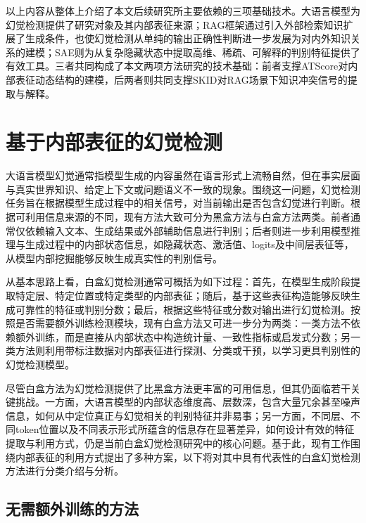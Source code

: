 以上内容从整体上介绍了本文后续研究所主要依赖的三项基础技术。大语言模型为幻觉检测提供了研究对象及其内部表征来源；RAG框架通过引入外部检索知识扩展了生成条件，也使幻觉检测从单纯的输出正确性判断进一步发展为对内外知识关系的建模；SAE则为从复杂隐藏状态中提取高维、稀疏、可解释的判别特征提供了有效工具。三者共同构成了本文两项方法研究的技术基础：前者支撑ATScore对内部表征动态结构的建模，后两者则共同支撑SKID对RAG场景下知识冲突信号的提取与解释。

\section{基于内部表征的幻觉检测}\label{sec:white_box_hallucination_detection}


大语言模型幻觉通常指模型生成的内容虽然在语言形式上流畅自然，但在事实层面与真实世界知识、给定上下文或问题语义不一致的现象。围绕这一问题，幻觉检测任务旨在根据模型生成过程中的相关信号，对当前输出是否包含幻觉进行判断。根据可利用信息来源的不同，现有方法大致可分为黑盒方法与白盒方法两类。前者通常仅依赖输入文本、生成结果或外部辅助信息进行判别；后者则进一步利用模型推理与生成过程中的内部状态信息，如隐藏状态、激活值、logits及中间层表征等，从模型内部挖掘能够反映生成真实性的判别信号。

从基本思路上看，白盒幻觉检测通常可概括为如下过程：首先，在模型生成阶段提取特定层、特定位置或特定类型的内部表征；随后，基于这些表征构造能够反映生成可靠性的特征或判别分数；最后，根据这些特征或分数对输出进行幻觉检测。按照是否需要额外训练检测模块，现有白盒方法又可进一步分为两类：一类方法不依赖额外训练，而是直接从内部状态中构造统计量、一致性指标或启发式分数；另一类方法则利用带标注数据对内部表征进行探测、分类或干预，以学习更具判别性的幻觉检测模型。

尽管白盒方法为幻觉检测提供了比黑盒方法更丰富的可用信息，但其仍面临若干关键挑战。一方面，大语言模型的内部状态维度高、层数深，包含大量冗余甚至噪声信息，如何从中定位真正与幻觉相关的判别特征并非易事；另一方面，不同层、不同token位置以及不同表示形式所蕴含的信息存在显著差异，如何设计有效的特征提取与利用方式，仍是当前白盒幻觉检测研究中的核心问题。基于此，现有工作围绕内部表征的利用方式提出了多种方案，以下将对其中具有代表性的白盒幻觉检测方法进行分类介绍与分析。

\subsection{无需额外训练的方法}\label{subsec:white_box_no_training}

